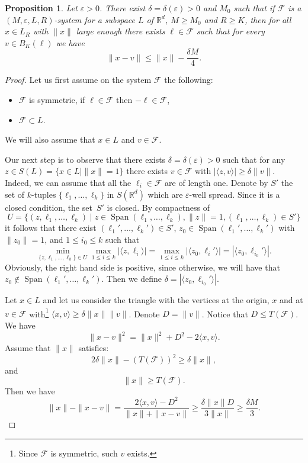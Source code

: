 \documentclass[10pt]{amsart}
\DeclareMathOperator{\Span}{Span}
\newcommand{\cF}{\mathcal{F}}
\newcommand{\bR}{\mathbb{R}}
\let\eps\varepsilon
\newcounter{dummy} \numberwithin{dummy}{section}
\theoremstyle{plain}
\newtheorem{prop}[dummy]{Proposition}
\theoremstyle{definition}
\begin{document}
\begin{prop}\label{prop}
Let $\eps > 0$.
There exist $\delta = \delta(\eps) > 0$ and $M_0$ such that if
$\cF$ is a $(M,\eps,L,R)$-system for a subspace $L$ of $\bR^d$, $M \ge M_0$ and $R \ge K$, then for all $x \in L_R$ with $\| x \|$ large enough there exists $\ell \in \cF$ such that for every $v \in B_K(\ell)$
we have
\[
\| x - v\| \le \| x \| - \frac{\delta M}{4}.
\]
\end{prop}
\begin{proof}
Let us first assume on the system $\cF$ the following:
\begin{itemize}
\item $\cF$ is symmetric, \ie if $\ell \in \cF$ then $-\ell \in \cF$,
\item $\cF \subset L.$
\end{itemize}
We will also assume that $x \in L$ and $v \in \cF$.

Our next step is to observe that there exists $\delta = \delta(\eps) > 0$ such that for any $z \in S(L) = \{ x \in L \mid \| x \| = 1 \}$ there exists $v \in \cF$ with $| \langle z, v \rangle | \ge \delta \| v \|$. Indeed, we can assume that all the $\ell_i \in \cF$ are of length one. Denote by $S'$ the set of $k$-tuples $\{\ell_1,\ldots,\ell_k\}$ in $S(\bR^d)$ which are $\eps$-well spread. Since it is a closed condition, the set~$S'$ is closed. By compactness of
\[
U = \{ (z,\ell_1,\ldots,\ell_k) \mid z \in \Span(\ell_1,\ldots,\ell_k), \| z \| = 1, (\ell_1,\ldots,\ell_k) \in S' \}
\]
it follows that there exist $(\ell_1',\ldots,\ell_k') \in S'$, $z_0 \in \Span(\ell_1',\ldots,\ell_k')$ with $\| z_0 \| = 1$, and $1 \le i_0 \le k$ such that
\[
\min_{\{z,\ell_1,\ldots,\ell_k\} \in U} \max_{1 \le i \le k} | \langle z, \ell_i \rangle | = \max_{1 \le i \le k} | \langle z_0, \ell_i' \rangle | = | \langle z_0,\ell_{i_0}' \rangle| .
\]
Obviously, the right hand side is positive, since otherwise, we will have that $z_0 \not \in \Span(\ell_1',\ldots,\ell_k')$. Then we define $\delta= | \langle z_0,\ell_{i_0}' \rangle |$.

Let $x \in L$ and let us consider the triangle with the vertices at the origin, $x$ and at $v \in \cF$ with\footnote{Since $\cF$ is symmetric, such $v$ exists.} $\langle x , v \rangle \ge \delta \| x \| \| v \|$.
Denote $D = \| v \|$. Notice that $D \le T(\cF)$. We have
\[
\|x-v\|^2 = \|x\|^2 + D^2 - 2 \langle x, v \rangle.
\]
Assume that $\| x \|$ satisfies:
\[
2 \delta \| x \| - (T(\cF))^2 \ge \delta \|x \|,
\]
and
\[
\| x \| \ge T(\cF).
\]
Then we have
\[
\|x\| - \|x-v\| = \frac{2 \langle x, v \rangle - D^2}{\| x \| + \| x- v \|} \ge \frac{\delta \| x \| D}{3 \| x \|} \ge \frac{\delta M}{3}.
\]


\end{proof}
\end{document}
